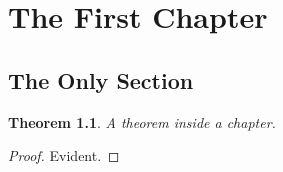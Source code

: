\documentclass{report}
\newtheorem{theorem}{Theorem}[section]
\begin{document}
\chapter{The First Chapter}
\label{chapter:only}

\section{The Only Section}
\label{section:only}

\begin{theorem}
\label{thm:in-chapter}
A theorem inside a chapter.
\end{theorem}

\begin{proof}
Evident.
\end{proof}
\end{document}
